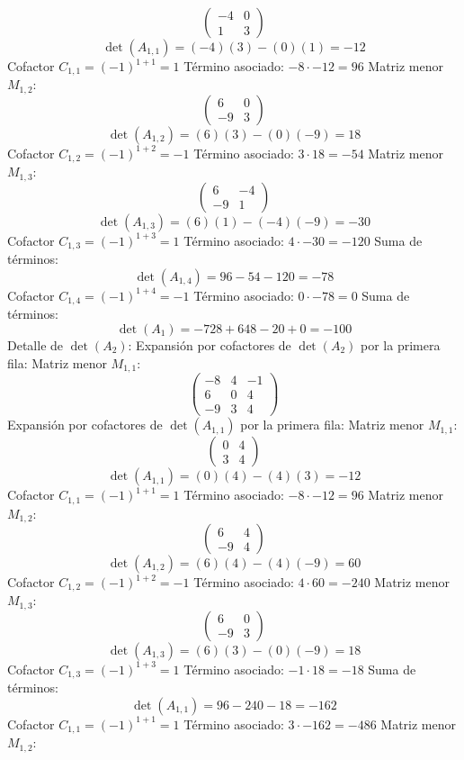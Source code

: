 \documentclass{article}
\begin{document}
\[\begin{pmatrix}-4 & 0 \\ 1 & 3\end{pmatrix}\]
\[\det(A_{1,1}) = (-4)(3) - (0)(1) = -12\]
Cofactor $C_{1,1} = (-1)^{1+1} = 1$
Término asociado: $ -8 \cdot -12 = 96 $
Matriz menor $M_{1,2}$:
\[\begin{pmatrix}6 & 0 \\ -9 & 3\end{pmatrix}\]
\[\det(A_{1,2}) = (6)(3) - (0)(-9) = 18\]
Cofactor $C_{1,2} = (-1)^{1+2} = -1$
Término asociado: $ 3 \cdot 18 = -54 $
Matriz menor $M_{1,3}$:
\[\begin{pmatrix}6 & -4 \\ -9 & 1\end{pmatrix}\]
\[\det(A_{1,3}) = (6)(1) - (-4)(-9) = -30\]
Cofactor $C_{1,3} = (-1)^{1+3} = 1$
Término asociado: $ 4 \cdot -30 = -120 $
Suma de términos:
\[\det(A_{1,4}) = 96 - 54 - 120 = -78\]
Cofactor $C_{1,4} = (-1)^{1+4} = -1$
Término asociado: $ 0 \cdot -78 = 0 $
Suma de términos:
\[\det(A_{1}) = -728 + 648 - 20 + 0 = -100\]
Detalle de $\det(A_{2})$:
Expansión por cofactores de $\det(A_{2})$ por la primera fila:
Matriz menor $M_{1,1}$:
\[\begin{pmatrix}-8 & 4 & -1 \\ 6 & 0 & 4 \\ -9 & 3 & 4\end{pmatrix}\]
Expansión por cofactores de $\det(A_{1,1})$ por la primera fila:
Matriz menor $M_{1,1}$:
\[\begin{pmatrix}0 & 4 \\ 3 & 4\end{pmatrix}\]
\[\det(A_{1,1}) = (0)(4) - (4)(3) = -12\]
Cofactor $C_{1,1} = (-1)^{1+1} = 1$
Término asociado: $ -8 \cdot -12 = 96 $
Matriz menor $M_{1,2}$:
\[\begin{pmatrix}6 & 4 \\ -9 & 4\end{pmatrix}\]
\[\det(A_{1,2}) = (6)(4) - (4)(-9) = 60\]
Cofactor $C_{1,2} = (-1)^{1+2} = -1$
Término asociado: $ 4 \cdot 60 = -240 $
Matriz menor $M_{1,3}$:
\[\begin{pmatrix}6 & 0 \\ -9 & 3\end{pmatrix}\]
\[\det(A_{1,3}) = (6)(3) - (0)(-9) = 18\]
Cofactor $C_{1,3} = (-1)^{1+3} = 1$
Término asociado: $ -1 \cdot 18 = -18 $
Suma de términos:
\[\det(A_{1,1}) = 96 - 240 - 18 = -162\]
Cofactor $C_{1,1} = (-1)^{1+1} = 1$
Término asociado: $ 3 \cdot -162 = -486 $
Matriz menor $M_{1,2}$:
\end{document}
